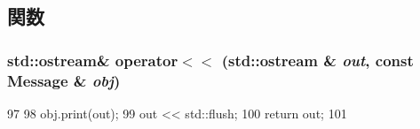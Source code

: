 \subsection{関数}
\hypertarget{Message_8hh_a2ffee80e920af5b05f2d20f90601654e}{
\subsubsection[{operator$<$$<$}]{\setlength{\rightskip}{0pt plus 5cm}std::ostream\& operator$<$$<$ (std::ostream \& {\em out}, \/  const {\bf Message} \& {\em obj})}}
\label{Message_8hh_a2ffee80e920af5b05f2d20f90601654e}



\begin{DoxyCode}
97 {
98     obj.print(out);
99     out << std::flush;
100     return out;
101 }
\end{DoxyCode}
